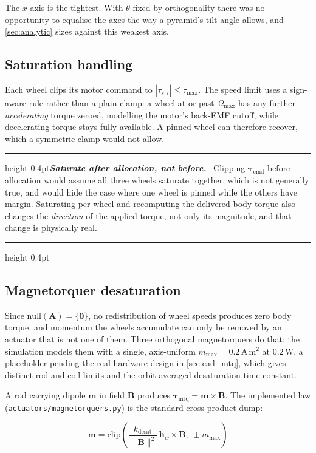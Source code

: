 \documentclass[conference,10pt,a4paper]{IEEEtran}
\newcommand{\remarkrule}{\par\nobreak\vspace{2pt}%
  \hrule height 0.4pt\vspace{4pt}\nobreak}
\newenvironment{designbox}[1][Design decision]
  {\par\medskip\remarkrule\noindent\small\textbf{\textit{#1.}}\ \ignorespaces}
  {\par\vspace{3pt}\hrule height 0.4pt\par\medskip\ignorespacesafterend}
\newenvironment{eqbox}{\ignorespaces}{\ignorespacesafterend}
\newcommand{\vect}[1]{\bm{#1}}
\newcommand{\mat}[1]{\bm{#1}}
\newcommand{\unit}[1]{\ensuremath{\,\mathrm{#1}}}
\begin{document}
The $x$ axis is the tightest. With $\theta$ fixed by orthogonality there was no
opportunity to equalise the axes the way a pyramid's tilt angle allows, and
\cref{sec:analytic} sizes against this weakest axis.

\subsection{Saturation handling}
\label{sec:sathandling}

Each wheel clips its motor command to $|\tau_{s,i}|\le\tau_\text{max}$. The
speed limit uses a sign-aware rule rather than a plain clamp: a wheel at or
past $\Omega_\text{max}$ has any further \emph{accelerating} torque zeroed,
modelling the motor's back-EMF cutoff, while decelerating torque stays fully
available. A pinned wheel can therefore recover, which a symmetric clamp would
not allow.

\begin{designbox}[Saturate after allocation, not before]
Clipping $\vect{\tau}_\text{cmd}$ before allocation would assume all three
wheels saturate together, which is not generally true, and would hide the case
where one wheel is pinned while the others have margin. Saturating per wheel
and recomputing the delivered body torque also changes the \emph{direction} of
the applied torque, not only its magnitude, and that change is physically real.
\end{designbox}

\subsection{Magnetorquer desaturation}
\label{sec:desat}

Since $\mathrm{null}(\mat{A})=\{\vect{0}\}$, no redistribution of wheel speeds
produces zero body torque, and momentum the wheels accumulate can only be
removed by an actuator that is not one of them. Three orthogonal magnetorquers
do that; the simulation models them with a single, axis-uniform
$m_\text{max}=0.2\unit{A\,m^2}$ at $0.2\unit{W}$, a placeholder pending the
real hardware design in \cref{sec:cad_mtq}, which gives distinct rod and coil
limits and the orbit-averaged desaturation time constant.

A rod carrying dipole $\vect{m}$ in field $\vect{B}$ produces
$\vect{\tau}_\text{mtq}=\vect{m}\times\vect{B}$. The implemented law
(\texttt{actuators/magnetorquers.py}) is the standard cross-product dump:

\begin{eqbox}
\begin{equation}
\vect{m} = \mathrm{clip}\!\left(\frac{k_\text{desat}}{\|\vect{B}\|^2}\,
\vect{h}_w\times\vect{B},\ \pm m_\text{max}\right)
\label{eq:mtqlaw}
\end{equation}
\end{eqbox}
\end{document}
